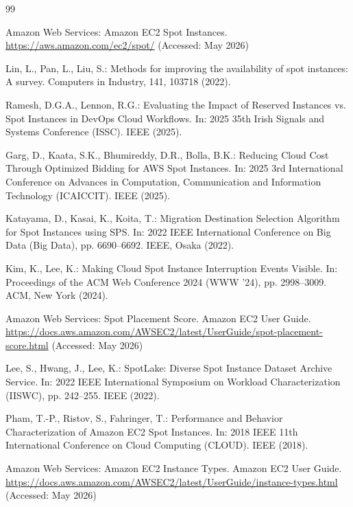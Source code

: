 \documentclass[11pt,a4paper]{ltjsreport}
\begin{document}
\begin{thebibliography}{99}

Amazon Web Services:
Amazon EC2 Spot Instances.
\url{https://aws.amazon.com/ec2/spot/}
(Accessed: May 2026)

Lin, L., Pan, L., Liu, S.:
Methods for improving the availability of spot instances: A survey.
Computers in Industry, 141, 103718 (2022).

Ramesh, D.G.A., Lennon, R.G.:
Evaluating the Impact of Reserved Instances vs. Spot Instances in DevOps Cloud Workflows.
In: 2025 35th Irish Signals and Systems Conference (ISSC). IEEE (2025).

Garg, D., Kaata, S.K., Bhumireddy, D.R., Bolla, B.K.:
Reducing Cloud Cost Through Optimized Bidding for AWS Spot Instances.
In: 2025 3rd International Conference on Advances in Computation,
Communication and Information Technology (ICAICCIT). IEEE (2025).

Katayama, D., Kasai, K., Koita, T.:
Migration Destination Selection Algorithm for Spot Instances using SPS.
In: 2022 IEEE International Conference on Big Data (Big Data),
pp. 6690--6692. IEEE, Osaka (2022).

Kim, K., Lee, K.:
Making Cloud Spot Instance Interruption Events Visible.
In: Proceedings of the ACM Web Conference 2024 (WWW '24),
pp. 2998--3009. ACM, New York (2024).

Amazon Web Services:
Spot Placement Score. Amazon EC2 User Guide.
\url{https://docs.aws.amazon.com/AWSEC2/latest/UserGuide/spot-placement-score.html}
(Accessed: May 2026)

Lee, S., Hwang, J., Lee, K.:
SpotLake: Diverse Spot Instance Dataset Archive Service.
In: 2022 IEEE International Symposium on Workload Characterization (IISWC),
pp. 242--255. IEEE (2022).

Pham, T.-P., Ristov, S., Fahringer, T.:
Performance and Behavior Characterization of Amazon EC2 Spot Instances.
In: 2018 IEEE 11th International Conference on Cloud Computing (CLOUD).
IEEE (2018).

Amazon Web Services:
Amazon EC2 Instance Types. Amazon EC2 User Guide.
\url{https://docs.aws.amazon.com/AWSEC2/latest/UserGuide/instance-types.html}
(Accessed: May 2026)

\end{thebibliography}
\end{document}
